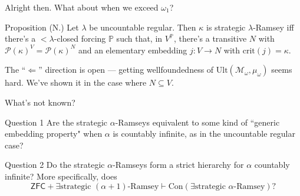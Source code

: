 \documentclass{beamer}
\begin{document}
\begin{frame}{Alright then. What about when we exceed $\omega_1$?}
  \begin{block}{Proposition (N.)}
    Let $\lambda$ be uncountable regular. Then $\kappa$ is strategic $\lambda$-Ramsey iff \pause there's a ${<}\lambda$-closed forcing $\mathbb P$ such that, in $V^{\mathbb P}$, there's a transitive $N$ with $\mathcal P(\kappa)^V=\mathcal P(\kappa)^N$ and an elementary embedding $j:V\to N$ with $\text{crit}(j)=\kappa$.
  \end{block}



  The ``$\Leftarrow$'' direction is open --- getting wellfoundedness of $\text{Ult}(\mathcal M_\omega,\mu_\omega)$ seems hard. We've shown it in the case where $N\subseteq V$.
\end{frame}

\begin{frame}{What's not known?}
  \begin{block}{Question 1}
    Are the strategic $\alpha$-Ramseys equivalent to some kind of ``generic embedding property" when $\alpha$ is countably infinite, as in the uncountable regular case?
  \end{block}
  
  \pause\begin{block}{Question 2}
    Do the strategic $\alpha$-Ramseys form a strict hierarchy for $\alpha$ countably infinite? More specifically, does
$$\textsf{ZFC}+\exists\text{strategic $(\alpha{+}1)$-Ramsey}\vdash\text{Con}(\exists\text{strategic $\alpha$-Ramsey})?$$
  \end{block}
  
\end{frame}
\end{document}
